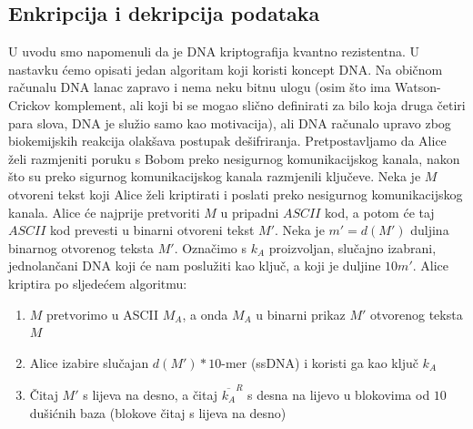 \documentclass[a4paper,oneside,12pt]{memoir} %
\begin{document}
\begin{spacing}{1.5}
\section{Enkripcija i dekripcija podataka}
\label{sec:EDDNA}
U uvodu smo napomenuli da je DNA kriptografija kvantno rezistentna. U nastavku ćemo opisati jedan algoritam koji koristi koncept DNA. Na običnom računalu DNA lanac zapravo i nema neku bitnu ulogu (osim što ima Watson-Crickov komplement, ali koji bi se mogao slično definirati za bilo koja druga četiri para slova, DNA je služio samo kao motivacija), ali DNA računalo upravo zbog biokemijskih reakcija olakšava postupak dešifriranja. Pretpostavljamo da Alice želi razmjeniti poruku s Bobom preko nesigurnog komunikacijskog kanala, nakon što su preko sigurnog komunikacijskog kanala razmjenili ključeve. Neka je $M$ otvoreni tekst koji Alice želi kriptirati i poslati preko nesigurnog komunikacijskog kanala. Alice će najprije pretvoriti $M$ u pripadni $ASCII$ kod, a potom će taj $ASCII$ kod prevesti u binarni otvoreni tekst $M'$. Neka je $m'=d(M')$ duljina binarnog otvorenog teksta $M'$. Označimo s $k_A$ proizvoljan, slučajno izabrani, jednolančani DNA koji će nam poslužiti kao ključ, a koji je duljine $10m'$. Alice kriptira po sljedećem algoritmu:
\begin{enumerate}
	\item $M$ pretvorimo u ASCII $M_A$, a onda $M_A$ u binarni prikaz $M'$ otvorenog teksta $M$
	\item Alice izabire slučajan $d(M')*10$-mer (ssDNA) i koristi ga kao ključ $k_A$
	\item Čitaj $M'$ s lijeva na desno, a čitaj $\overline{k_A}^R$ s  desna na lijevo u blokovima od $10$ dušićnih baza (blokove čitaj s lijeva na desno)
	

\end{enumerate}
\end{spacing}
\end{document}
